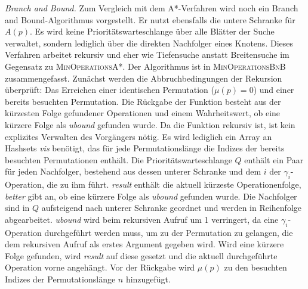 \documentclass[a4paper, 10pt, ngerman]{article}
\begin{document}
\emph{{Branch and Bound.}} Zum Vergleich mit dem A*-Verfahren wird noch ein Branch and Bound-Algorithmus vorgestellt. Er nutzt ebensfalls die untere Schranke für $A(p)$. Es wird keine Prioritätswarteschlange über alle Blätter der Suche verwaltet, sondern lediglich über die direkten Nachfolger eines Knotens. Dieses Verfahren arbeitet rekursiv und eher wie Tiefensuche anstatt Breitensuche im Gegensatz zu \textsc{MinOperationsA*}. Der Algorithmus ist in \textsc{MinOperationsBnB} zusammengefasst. Zunächst werden die Abbruchbedingungen der Rekursion überprüft: Das Erreichen einer identischen Permutation ($\mu(p) = 0$) und einer bereits besuchten Permutation. Die Rückgabe der Funktion besteht aus der kürzesten Folge gefundener Operationen und einem Wahrheitswert, ob eine kürzere Folge als \emph{ubound} gefunden wurde. Da die Funktion rekursiv ist, ist kein explizites Verwalten des Vorgängers nötig. Es wird lediglich ein Array an Hashsets \emph{vis} benötigt, das für jede Permutationslänge die Indizes der bereits besuchten Permutationen enthält. Die Prioritätswarteschlange $Q$ enthält ein Paar für jeden Nachfolger, bestehend aus dessen unterer Schranke und dem $i$ der $\gamma_i$-Operation, die zu ihm führt. \emph{result} enthält die aktuell kürzeste Operationenfolge, \emph{better} gibt an, ob eine kürzere Folge als \emph{ubound} gefunden wurde. Die Nachfolger sind in $Q$ aufsteigend nach unterer Schranke geordnet und werden in Reihenfolge abgearbeitet. \emph{ubound} wird beim rekursiven Aufruf um 1 verringert, da eine $\gamma_i$-Operation durchgeführt werden muss, um zu der Permutation zu gelangen, die dem rekursiven Aufruf als erstes Argument gegeben wird. Wird eine kürzere Folge gefunden, wird \emph{result} auf diese gesetzt und die aktuell durchgeführte Operation vorne angehängt. Vor der Rückgabe wird $\mu(p)$ zu den besuchten Indizes der Permutationslänge $n$ hinzugefügt.
\end{document}

